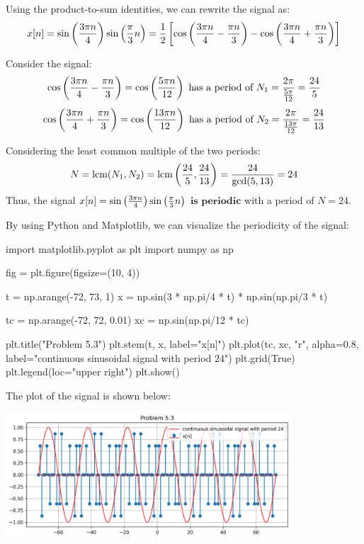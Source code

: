 \documentclass[a4paper, 10pt]{article}
\begin{document}
\begin{solution}
Using the product-to-sum identities, we can rewrite the signal as:
\[
    x[n] = \sin \left( \frac{3\pi n}{4} \right)\sin\left( \frac{\pi}{3}n \right) = \frac{1}{2} \left[ \cos \left( \frac{3\pi n}{4} - \frac{\pi n}{3} \right) - \cos \left( \frac{3\pi n}{4} + \frac{\pi n}{3} \right) \right]
\]

Consider the signal:
\[
    \cos \left( \frac{3\pi n}{4} - \frac{\pi n}{3} \right) = \cos \left( \frac{5\pi n}{12} \right) \text{ has a period of } N_1 = \frac{2\pi}{\frac{5\pi}{12}} = \frac{24}{5}
\]
\[
    \cos \left( \frac{3\pi n}{4} + \frac{\pi n}{3} \right) = \cos \left( \frac{13\pi n}{12} \right) \text{ has a period of } N_2 = \frac{2\pi}{\frac{13\pi}{12}} = \frac{24}{13}
\]

Considering the least common multiple of the two periods:
\[
    N = \text{lcm}(N_1, N_2) = \text{lcm}\left(\frac{24}{5}, \frac{24}{13}\right) = \frac{24}{\text{gcd}(5, 13)} = 24
\]
Thus, the signal \( x[n] = \sin \left( \frac{3\pi n}{4} \right)\sin\left( \frac{\pi}{3}n \right) \) \( \boxed{\textbf{is periodic}} \) with a period of \( \boxed{N = 24} \).

\vspace{5mm}

By using Python and Matplotlib, we can visualize the periodicity of the signal:
\begin{codingbox}
import matplotlib.pyplot as plt
import numpy as np

fig = plt.figure(figsize=(10, 4))

t = np.arange(-72, 73, 1)
x = np.sin(3 * np.pi/4 * t) * np.sin(np.pi/3 * t)

tc = np.arange(-72, 72, 0.01)
xc = np.sin(np.pi/12 * tc)

plt.title("Problem 5.3")
plt.stem(t, x, label="x[n]")
plt.plot(tc, xc, "r", alpha=0.8, label="continuous sinusoidal signal with period 24")
plt.grid(True)
plt.legend(loc="upper right")
plt.show()
\end{codingbox}

The plot of the signal is shown below:
\begin{center}
    \includegraphics[width=0.8\textwidth]{images/problem_5_3.png}
\end{center}
\end{solution}
\end{document}

